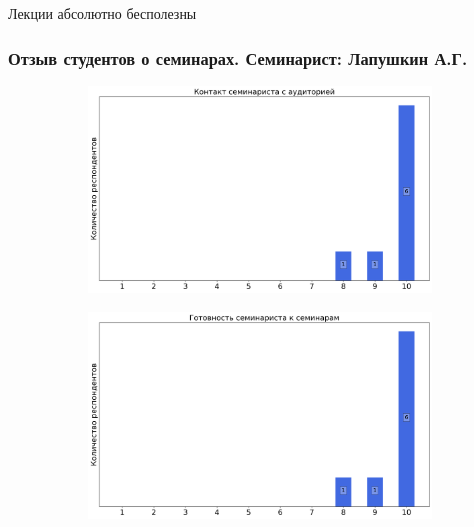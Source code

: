             \begin{commentbox} 
                Лекции абсолютно бесполезны 
            \end{commentbox}    

    
    \subsubsection{Отзыв студентов о семинарах. Семинарист: Лапушкин А.Г.}
		\begin{figure}[H]
			\centering
			\begin{subfigure}[b]{0.45\textwidth}
				\centering
				\includegraphics[width=\textwidth]{images/4 course/Введение в распараллеливание алгоритмов и программ/seminarists-marks-Лапушкин А.Г.-0.png}
			\end{subfigure}
			\begin{subfigure}[b]{0.45\textwidth}
				\centering
				\includegraphics[width=\textwidth]{images/4 course/Введение в распараллеливание алгоритмов и программ/seminarists-marks-Лапушкин А.Г.-1.png}

\end{subfigure}
\end{figure}
